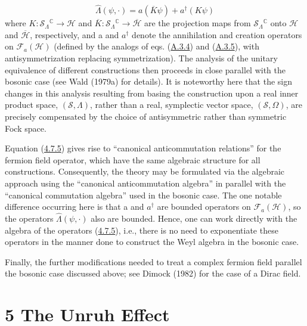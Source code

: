 \documentclass[11pt,a4paper]{article}
\begin{document}
\begin{equation*}
\hat{\Lambda}(\psi, \cdot) = a(\overline{K}\psi) + a^{\dagger}(K\psi) \tag{4.7.5}\label{eq:4.7.5}
\end{equation*} \hypertarget{source-117}{} where \(K: \mathcal{S}_\Lambda{}^\mathbb{C} \to \mathcal{H}\) and \(\overline{K}: \mathcal{S}_\Lambda{}^\mathbb{C} \to \overline{\mathcal{H}}\) are the projection maps from \(\mathcal{S}_\Lambda{}^\mathbb{C}\) onto \(\mathcal{H}\) and \(\overline{\mathcal{H}}\), respectively, and a and \(a^\dagger\) denote the annihilation and creation operators on \(\mathcal{F}_a(\mathcal{H})\) (defined by the analogs of eqs. (\hyperref[eq:A.3.4]{A.3.4}) and (\hyperref[eq:A.3.5]{A.3.5}), with antisymmetrization replacing symmetrization). The analysis of the unitary equivalence of different constructions then proceeds in close parallel with the bosonic case (see Wald (1979a) for details). It is noteworthy here that the sign changes in this analysis resulting from basing the construction upon a real inner product space, \((\mathcal{S},\Lambda)\), rather than a real, symplectic vector space, \((\mathcal{S},\Omega)\), are precisely compensated by the choice of antisymmetric rather than symmetric Fock space.

Equation (\hyperref[eq:4.7.5]{4.7.5}) gives rise to ``canonical anticommutation relations'' for the fermion field operator, which have the same algebraic structure for all constructions. Consequently, the theory may be formulated via the algebraic approach using the ``canonical anticommutation algebra'' in parallel with the ``canonical commutation algebra'' used in the bosonic case. The one notable difference occurring here is that a and \(a^\dagger\) are bounded operators on \(\mathcal{F}_a(\mathcal{H})\), so the operators \(\widehat{\Lambda}(\psi,\cdot)\) also are bounded. Hence, one can work directly with the algebra of the operators (\hyperref[eq:4.7.5]{4.7.5}), i.e., there is no need to exponentiate these operators in the manner done to construct the Weyl algebra in the bosonic case.

Finally, the further modifications needed to treat a complex fermion field parallel the bosonic case discussed above; see Dimock (1982) for the case of a Dirac field.

\clearpage
\hypertarget{source-118}{}
\section*{5 The Unruh Effect}\hypertarget{sec:5}{}
\end{document}
